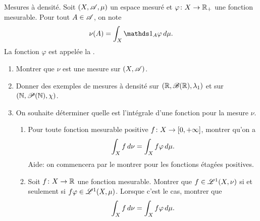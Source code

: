 \begin{td-exo}[] %
    Mesures à densité. Soit \(\left(X,\mathscr{A},\mu\right)\) un espace mesuré et
    \(\varphi\colon X\to\mathbb{R}_+\) une fonction mesurable. Pour tout \(A\in\mathscr{A}\),
    on note
    \begin{equation*}
        \nu(A)=\int_X \one_A\varphi\der\mu.
    \end{equation*}
    La fonction \(\varphi\) est appelée la .
    \begin{enumerate}
        \item Montrer que \(\nu\) est une mesure sur \(\left(X,\mathscr{A}\right)\).

        \item Donner des exemples de mesures à densité sur \(\left(\mathbb{R},\mathscr{B}(\mathbb{R}),\lambda_1\right)\)
        et sur \(\left(\mathbb{N}, \mathscr{P}(\mathbb{N}),\chi\right)\).

        \item On souhaite déterminer quelle est l'intégrale d'une fonction pour la mesure \(\nu\).
        \begin{enumerate}
            \item Pour toute fonction mesurable positive \(f\colon X\to\mathopen{}\left[0,+\infty\right]\mathclose{}\),
            montrer qu'on a
            \begin{equation*}
                \int_X f\mathop{}\!{d}\nu=\int_X f\varphi\mathop{}\!{d}\mu.
            \end{equation*}
            Aide: on commencera par le montrer pour les fonctions étagées positives.

            \item Soit \(f\colon X\to\mathbb{R}\) une fonction mesurable. Montrer que
            \(f\in\mathscr{L}^1(X,\nu)\) si et seulement si \(f\varphi\in\mathscr{L}^1(X,\mu)\).
            Lorsque c'est le cas, montrer que
            \begin{equation*}
                \int_X f\mathop{}\!{d}\nu=\int_X f\varphi\mathop{}\!{d}\mu.
            \end{equation*}
        \end{enumerate}
    \end{enumerate}
\end{td-exo}
